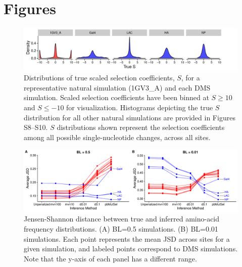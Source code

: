 \documentclass[11pt]{article}
\begin{document}
\clearpage
\section*{Figures}

\begin{figure}[htbp]
  \centerline{\includegraphics[width=6in]{Figures/small_selcoeffs.pdf}}
  \caption{\label{fig:example-selcoeffs} Distributions of true scaled selection coefficients, $S$, for a representative natural simulation (1GV3\_A) and each DMS simulation. Scaled selection coefficients have been binned at $S\geq10$ and $S\leq-10$ for visualization. Histograms depicting the true $S$ distribution for all other natural simulations are provided in Figures S8--S10. $S$ distributions shown represent the selection coefficients among all possible single-nucleotide changes, across all sites.}
\end{figure}



\vspace{3cm}
\begin{figure}[htbp]
  \centerline{\includegraphics[width=5in]{Figures/jsd_lineplot.pdf}}
  \caption{\label{fig:jsd_lineplots} Jensen-Shannon distance between true and inferred amino-acid frequency distributions. (A) BL=0.5 simulations. (B) BL=0.01 simulations. Each point represents the mean JSD across sites for a given simulation, and labeled points correspond to DMS simulations. Note that the y-axis of each panel has a different range.}
\end{figure}
\end{document}
